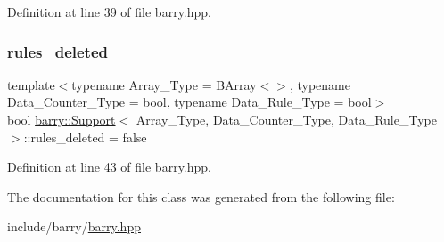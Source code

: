 Definition at line 39 of file barry.\+hpp.

\mbox{\label{classbarry_1_1_support_ab06f3a207f1d647d327a815bcedba9dd}} 
\subsubsection{\texorpdfstring{rules\+\_\+deleted}{rules\_deleted}}
{\footnotesize\ttfamily template$<$typename Array\+\_\+\+Type  = B\+Array$<$$>$, typename Data\+\_\+\+Counter\+\_\+\+Type  = bool, typename Data\+\_\+\+Rule\+\_\+\+Type  = bool$>$ \\
bool \hyperlink{classbarry_1_1_support}{barry\+::\+Support}$<$ Array\+\_\+\+Type, Data\+\_\+\+Counter\+\_\+\+Type, Data\+\_\+\+Rule\+\_\+\+Type $>$\+::rules\+\_\+deleted = false}



Definition at line 43 of file barry.\+hpp.



The documentation for this class was generated from the following file\+:\begin{DoxyCompactItemize}
\item 
include/barry/\hyperlink{barry_8hpp}{barry.\+hpp}\end{DoxyCompactItemize}
